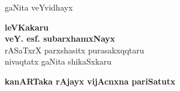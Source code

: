 \thispagestyle{empty}
\begin{center}
{\fontsize{30}{32}\selectfont gaNita veYvidhayx}
\vfill


{\Large\bfseries leVKakaru}\\[4pt]
{\LARGE\bfseries veY. esf. subarxhamxNayx}\\[4pt]
{\large rASaTxrX parxshasitx purasakxqqtaru\\[4pt]
nivaqtatx gaNita shikaSxkaru}
\vfill

{\Large\bfseries kanARTaka rAjayx vijAcnxna pariSatutx}





\end{center}
